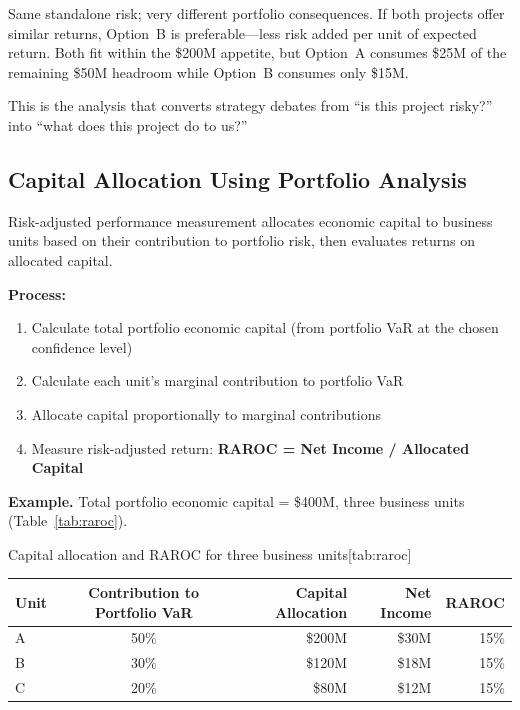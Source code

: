 \documentclass[11pt,openany]{book}
\providecommand{\tightlist}{\setlength{\itemsep}{0pt}\setlength{\parskip}{0pt}}
\begin{document}
Same standalone risk; very different portfolio consequences. If both projects
offer similar returns, Option~B is preferable---less risk added per unit of
expected return. Both fit within the \$200M appetite, but Option~A consumes
\$25M of the remaining \$50M headroom while Option~B consumes only \$15M.

This is the analysis that converts strategy debates from ``is this project
risky?'' into ``what does this project do to us?''

\subsection{Capital Allocation Using Portfolio Analysis}
\label{subsec:capital-allocation}

Risk-adjusted performance measurement allocates economic capital to business
units based on their contribution to portfolio risk, then evaluates returns on
allocated capital.

\textbf{Process:}
\begin{enumerate}\tightlist
  \item Calculate total portfolio economic capital (from portfolio VaR at the
        chosen confidence level)
  \item Calculate each unit's marginal contribution to portfolio VaR
  \item Allocate capital proportionally to marginal contributions
  \item Measure risk-adjusted return:
        \textbf{RAROC = Net Income / Allocated Capital}
\end{enumerate}

\textbf{Example.} Total portfolio economic capital = \$400M, three business
units (Table~\ref{tab:raroc}).

\begin{ermtable}{Capital allocation and RAROC for three business units}[tab:raroc]
\begin{tabular}{@{}lcrrr@{}}
\toprule
\textbf{Unit} & \textbf{Contribution to Portfolio VaR} &
\textbf{Capital Allocation} & \textbf{Net Income} & \textbf{RAROC} \\
\midrule
A & 50\% & \$200M & \$30M & 15\% \\
B & 30\% & \$120M & \$18M & 15\% \\
C & 20\% & \$80M  & \$12M & 15\% \\
\bottomrule
\end{tabular}
\end{ermtable}
\end{document}
